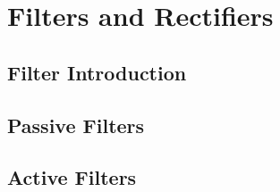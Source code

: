 \chapter{Filters and Rectifiers}
\label{cha:filters_rectifiers}
    \section{Filter Introduction}
    \section{Passive Filters}
    \section{Active Filters}